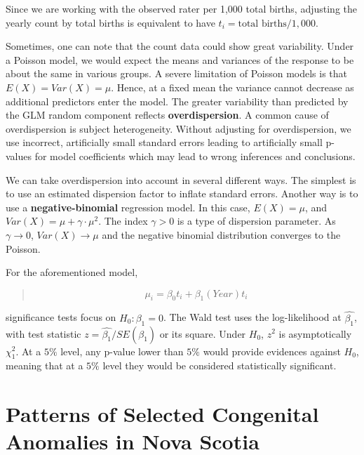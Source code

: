 \documentclass[
]{krantz}
\begin{document}
Since we are working with the observed rater per 1,000 total births, adjusting the yearly count by total births is equivalent to have \(t_{i} = \text{total births}/1,000\).

Sometimes, one can note that the count data could show great variability. Under a Poisson model, we would expect the means and variances of the response to be about the same in various groups. A severe limitation of Poisson models is that \(E \left(X \right) = Var \left(X \right) = \mu\). Hence, at a fixed mean the variance cannot decrease as additional predictors enter the model. The greater variability than predicted by the GLM random component reflects \textbf{overdispersion}. A common cause of overdispersion is subject heterogeneity. Without adjusting for overdispersion, we use incorrect, artificially small standard errors leading to artificially small p-values for model coefficients which may lead to wrong inferences and conclusions.

We can take overdispersion into account in several different ways. The simplest is to use an estimated dispersion factor to inflate standard errors. Another way is to use a \textbf{negative-binomial} regression model. In this case, \(E\left(X\right)= \mu\), and \(Var \left( X \right) = \mu + \gamma \cdot \mu^{2}\). The index \(\gamma > 0\) is a type of dispersion parameter. As \(\gamma \rightarrow 0\), \(Var \left( X \right) \rightarrow \mu\) and the negative binomial distribution converges to the Poisson.

For the aforementioned model,

\begin{quote}
\[
\mu_{i} = \beta_{0}t_{i} + \beta_{1}(Year)t_{i}
\]
\end{quote}

significance tests focus on \(H_{0}: \beta_{1} =0\). The Wald test uses the log-likelihood at \(\hat{\beta_{1}}\), with test statistic \(z=\hat{\beta_{1}} / SE(\hat{\beta_{1}})\) or its square. Under \(H_{0}\), \(z^{2}\) is asymptotically \(\chi^{2}_{1}\). At a \(5\%\) level, any p-value lower than \(5\%\) would provide evidences against \(H_{0}\), meaning that at a \(5\%\) level they would be considered statistically significant.

\hypertarget{chapter2}{%
\chapter{Patterns of Selected Congenital Anomalies in Nova Scotia}\label{chapter2}}
\end{document}
